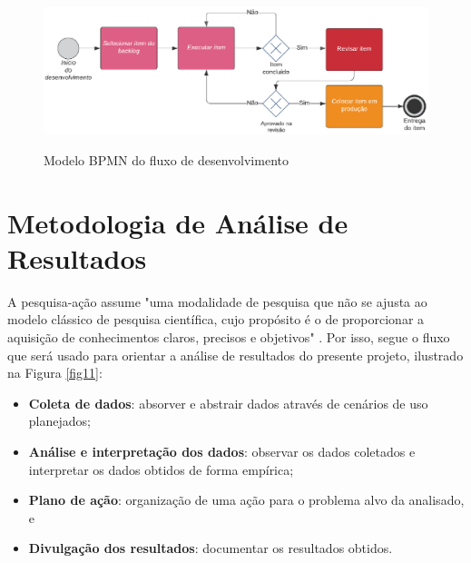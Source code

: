     \begin{figure}[!h]
    	\centering
    	\caption{Modelo BPMN do fluxo de desenvolvimento}
    	\includegraphics[keepaspectratio=true,scale=0.6]{figuras/fluxo_dev.eps}
    	\label{fig10}
    \end{figure}
    
\section{Metodologia de Análise de Resultados}

A pesquisa-ação assume "uma modalidade de pesquisa que não se ajusta ao modelo clássico de pesquisa científica, cujo propósito é o de proporcionar a aquisição de conhecimentos claros, precisos e objetivos" \cite{MetodoPesquisa}. Por isso, segue o fluxo que será usado para orientar a análise de resultados do presente projeto, ilustrado na Figura \ref{fig11}:

\begin{itemize}
		\item \textbf{Coleta de dados}: absorver e abstrair dados através de cenários de uso planejados;
		\item \textbf{Análise e interpretação dos dados}: observar os dados coletados e interpretar os dados obtidos de forma empírica;
		\item \textbf{Plano de ação}: organização de uma ação para o problema alvo da analisado, e
		\item \textbf{Divulgação dos resultados}: documentar os resultados obtidos.
\end{itemize}

